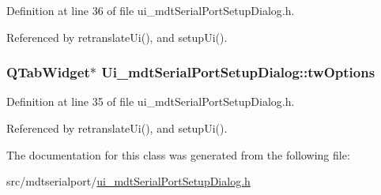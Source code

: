 Definition at line 36 of file ui\-\_\-mdt\-Serial\-Port\-Setup\-Dialog.\-h.



Referenced by retranslate\-Ui(), and setup\-Ui().

\hypertarget{class_ui__mdt_serial_port_setup_dialog_a679def9ad26fd3b5d14ce47c0445dae9}{
\subsubsection[{tw\-Options}]{\setlength{\rightskip}{0pt plus 5cm}Q\-Tab\-Widget$\ast$ Ui\-\_\-mdt\-Serial\-Port\-Setup\-Dialog\-::tw\-Options}}\label{class_ui__mdt_serial_port_setup_dialog_a679def9ad26fd3b5d14ce47c0445dae9}


Definition at line 35 of file ui\-\_\-mdt\-Serial\-Port\-Setup\-Dialog.\-h.



Referenced by retranslate\-Ui(), and setup\-Ui().



The documentation for this class was generated from the following file\-:\begin{DoxyCompactItemize}
\item 
src/mdtserialport/\hyperlink{ui__mdt_serial_port_setup_dialog_8h}{ui\-\_\-mdt\-Serial\-Port\-Setup\-Dialog.\-h}\end{DoxyCompactItemize}
